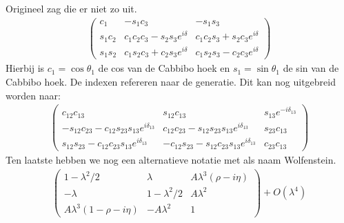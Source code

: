 \documentclass[../main.tex]{subfiles}
\begin{document}
Origineel zag die er niet zo uit.
\begin{equation}
    \begin{aligned}
        \label{eq:ckm_origineel}
        \left(\begin{array}{ccc}
                c_{1} & -s_{1} c_{3} & -s_{1} s_{3} \\
                s_{1} c_{2} & c_{1} c_{2} c_{3}-s_{2} s_{3} e^{i \delta} & c_{1} c_{2} s_{3}+s_{2} c_{3} e^{i \delta} \\
                s_{1} s_{2} & c_{1} s_{2} c_{3}+c_{2} s_{3} e^{i \delta} & c_{1} s_{2} s_{3}-c_{2} c_{3} e^{i \delta}
        \end{array}\right)
    \end{aligned}
\end{equation}
Hierbij is $c_1 = \cos\theta_1$ de cos van de Cabbibo hoek en $s_1 = \sin\theta_1$ de sin van de Cabbibo hoek. De indexen refereren naar de generatie. Dit kan nog uitgebreid worden naar:
\begin{equation}
    \begin{aligned}
        \label{eq:ckm_uitgebreid}
        \left(\begin{array}{ccc}
                c_{12} c_{13} & s_{12} c_{13} & s_{13} e^{-i \delta_{13}} \\
                -s_{12} c_{23}-c_{12} s_{23} s_{13} e^{i \delta_{13}} & c_{12} c_{23}-s_{12} s_{23} s_{13} e^{i \delta_{13}} & s_{23} c_{13} \\
                s_{12} s_{23}-c_{12} c_{23} s_{13} e^{i \delta_{13}} & -c_{12} s_{23}-s_{12} c_{23} s_{13} e^{i \delta_{13}} & c_{23} c_{13}
        \end{array}\right)
    \end{aligned}
\end{equation}
Ten laatste hebben we nog een alternatieve notatie met als naam Wolfenstein.
\begin{equation}
    \begin{aligned}
        \label{eq:wolfenstein_ckm}
        \left(\begin{array}{ccc}
                1-\lambda^{2} / 2 & \lambda & A \lambda^{3}(\rho-i \eta) \\
                -\lambda & 1-\lambda^{2} / 2 & A \lambda^{2} \\
                A \lambda^{3}(1-\rho-i \eta) & -A \lambda^{2} & 1
        \end{array}\right)+O\left(\lambda^{4}\right)
    \end{aligned}
\end{equation}
\end{document}
